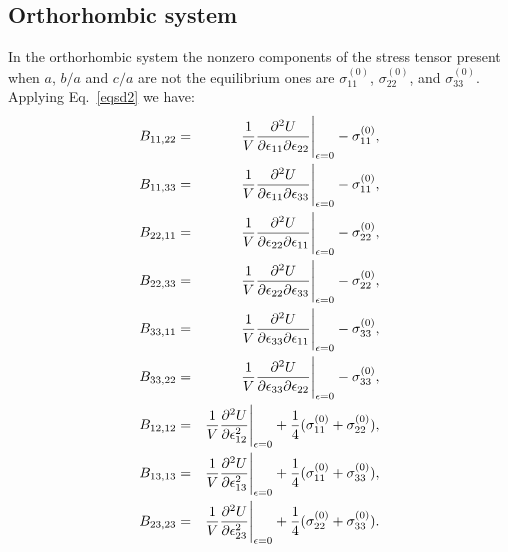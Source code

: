 \documentclass[12pt,a4paper]{article}
\begin{document}
\subsection{\color{web-blue}Orthorhombic system}
In the orthorhombic system the nonzero components of the stress tensor 
present when $a$, $b/a$ and $c/a$ are not the equilibrium ones are
$\sigma^{(0)}_{11}$, $\sigma^{(0)}_{22}$, and $\sigma^{(0)}_{33}$.
Applying Eq.~\ref{eqsd2} we have:
\begin{eqnarray}
B_{11,22} &=& {1 \over V}{\partial^2 U \over \partial \epsilon_{11} 
\partial \epsilon_{22}}\Bigg|_{\epsilon=0} - \sigma^{(0)}_{11}, \\
B_{11,33} &=& {1 \over V}{\partial^2 U \over \partial \epsilon_{11} 
\partial \epsilon_{33}}\Bigg|_{\epsilon=0} - \sigma^{(0)}_{11}, \\
B_{22,11} &=& {1 \over V}{\partial^2 U \over \partial \epsilon_{22} 
\partial \epsilon_{11}}\Bigg|_{\epsilon=0} - \sigma^{(0)}_{22}, \\
B_{22,33} &=& {1 \over V}{\partial^2 U \over \partial \epsilon_{22} 
\partial \epsilon_{33}}\Bigg|_{\epsilon=0} - \sigma^{(0)}_{22}, \\
B_{33,11} &=& {1 \over V}{\partial^2 U \over \partial \epsilon_{33} 
\partial \epsilon_{11}}\Bigg|_{\epsilon=0} - \sigma^{(0)}_{33}, \\
B_{33,22} &=& {1 \over V}{\partial^2 U \over \partial \epsilon_{33} 
\partial \epsilon_{22}}\Bigg|_{\epsilon=0} - \sigma^{(0)}_{33}, \\
B_{12,12} &=& {1 \over V}{\partial^2 U \over \partial \epsilon_{12}^2 }\Bigg|_{\epsilon=0} + {1\over 4} (\sigma^{(0)}_{11} +\sigma^{(0)}_{22}), \\
B_{13,13} &=& {1 \over V}{\partial^2 U \over \partial \epsilon_{13}^2}\Bigg|_{\epsilon=0} + {1\over 4} (\sigma^{(0)}_{11}+\sigma^{(0)}_{33}), \\
B_{23,23} &=& {1 \over V}{\partial^2 U \over \partial \epsilon_{23}^2 }\Bigg|_{\epsilon=0} + {1\over 4} (\sigma^{(0)}_{22}+\sigma^{(0)}_{33}).
\end{eqnarray}
\end{document}
